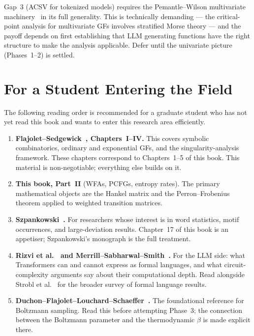 Gap~3 (ACSV for tokenized models) requires the Pemantle--Wilson
multivariate machinery~\cite{PemantleWilson2013} in its full
generality.  This is technically demanding --- the critical-point
analysis for multivariate GFs involves stratified Morse theory ---
and the payoff depends on first establishing that LLM generating
functions have the right structure to make the analysis applicable.
Defer until the univariate picture (Phases~1--2) is settled.

\section{For a Student Entering the Field}
\label{ch19:student}

The following reading order is recommended for a graduate student
who has not yet read this book and wants to enter this research area
efficiently.

\begin{enumerate}
  \item \textbf{Flajolet--Sedgewick~\cite{FlajoletSedgewick2009},
  Chapters~I--IV.}  This covers symbolic combinatorics, ordinary and
  exponential GFs, and the singularity-analysis framework.  These
  chapters correspond to Chapters~1--5 of this book.  This material is
  non-negotiable; everything else builds on it.

  \item \textbf{This book, Part~II} (WFAs, PCFGs, entropy rates).
  The primary mathematical objects are the Hankel matrix and the
  Perron--Frobenius theorem applied to weighted transition matrices.

  \item \textbf{Szpankowski~\cite{Szpankowski2001}.}  For researchers
  whose interest is in word statistics, motif occurrences, and
  large-deviation results.  Chapter~17 of this book is an appetiser;
  Szpankowski's monograph is the full treatment.

  \item \textbf{Rizvi et al.~\cite{RizviEtAl2024} and
  Merrill--Sabharwal--Smith~\cite{MerrillSabharwalSmith2022}.}  For the
  LLM side: what Transformers can and cannot express as formal languages,
  and what circuit-complexity arguments say about their computational
  depth.  Read alongside Strobl et al.~\cite{StroblEtAl2024} for the
  broader survey of formal language results.

  \item \textbf{Duchon--Flajolet--Louchard--Schaeffer~\cite{DuchonFlajoletLouchardSchaeffer2004}.}
  The foundational reference for Boltzmann sampling.  Read this before
  attempting Phase~3; the connection between the Boltzmann parameter and
  the thermodynamic $\beta$ is made explicit there.
\end{enumerate}

